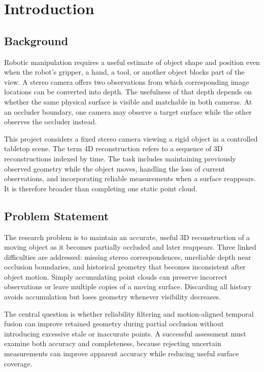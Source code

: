 \chapter{Introduction}
\section{Background}
Robotic manipulation requires a useful estimate of object shape and position even when the robot's gripper, a hand, a tool, or another object blocks part of the view. A stereo camera offers two observations from which corresponding image locations can be converted into depth. The usefulness of that depth depends on whether the same physical surface is visible and matchable in both cameras. At an occluder boundary, one camera may observe a target surface while the other observes the occluder instead.

This project considers a fixed stereo camera viewing a rigid object in a controlled tabletop scene. The term 4D reconstruction refers to a sequence of 3D reconstructions indexed by time. The task includes maintaining previously observed geometry while the object moves, handling the loss of current observations, and incorporating reliable measurements when a surface reappears. It is therefore broader than completing one static point cloud.

\section{Problem Statement}
The research problem is to maintain an accurate, useful 3D reconstruction of a moving object as it becomes partially occluded and later reappears. Three linked difficulties are addressed: missing stereo correspondences, unreliable depth near occlusion boundaries, and historical geometry that becomes inconsistent after object motion. Simply accumulating point clouds can preserve incorrect observations or leave multiple copies of a moving surface. Discarding all history avoids accumulation but loses geometry whenever visibility decreases.

The central question is whether reliability filtering and motion-aligned temporal fusion can improve retained geometry during partial occlusion without introducing excessive stale or inaccurate points. A successful assessment must examine both accuracy and completeness, because rejecting uncertain measurements can improve apparent accuracy while reducing useful surface coverage.

